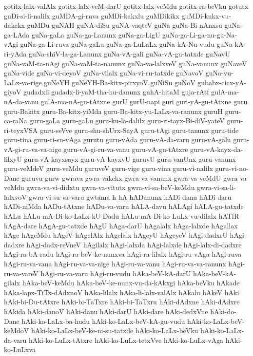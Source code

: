{gotitx-lalx-valAlx
gotitx-lalx-veM-darU
gotitx-lalx-veMdu
gotitx-ra-beVku
gotutx
guDi-si-li-nalilx
guMDA-gi-ruva
guMDi-kakxlu
guMDikikx
guMDi-kukx-vu-dakekx
guMDu
guNAH
guNA-diSu
guNA-vaqteV
guNa
guNa-Bi-nAnxsu
guNa-ga-LAda
guNa-gaLa
guNa-ga-Lanunx
guNa-ga-LigU
guNa-ga-Li-ga-nu-gu-Na-vAgi
guNa-ga-Li-ruva
guNa-gaLu
guNa-ga-LuLaLx
guNa-kA-Nu-vudu
guNa-kA-ri-yAda
guNa-shiV-la-ga-Lanunx
guNa-vA-gali
guNa-vA-gu-tatxde
guNavU
guNa-vaM-ta-nAgi
guNa-vaM-ta-nanunx
guNa-va-lalxveV
guNa-vanunx
guNaveV
guNa-vide
guNa-vi-deyoV
guNa-vilalx
guNa-vi-ru-tatxde
guNavoV
guNa-vu-LaLx-va-rige
guNeYH
guNeYH-Ba-kitx-pirxyoV
guNiSu
guNoV
gubabx-cicx-yA-giyoV
gudadxli
gudadx-li-yaM-tha-hu-danunx
guhA-hitaM
guja-rAtf
gulA-ma-nA-da-vanu
gulA-ma-nA-gu-tAtxne
gurU
gurU-napi
guri
guri-yA-gu-tAtxne
guru
guru-Bakitx
guru-Ba-kitx-yiMda
guru-Ba-kitx-yu-LaLx-va-ranunx
guruH
guru-ca-raNa
guru-gaLa
guru-gaLu
guru-ku-la-dalilx
guru-ri-tayx-Bi-diV-yateV
guru-ri-teyxVSA
guru-seVve
guru-shu-shUrx-SayA
guru-tAgi
guru-tanunx
guru-tide
guru-tina
guru-ti-su-vAga
gurutu
guru-vAda
guru-vA-da-varu
guru-vA-galu
guru-vA-gi-ru-va-va-nige
guru-vA-gi-ru-va-vanu
guru-vA-gu-tAtxre
guru-vA-kayx-da-lilxyU
guru-vA-kayxsayx
guru-vA-kayxvU
guruvU
guru-vanUnx
guru-vanunx
guru-veMdeV
guru-veMdu
guruveV
guru-vige
guru-vina
guru-vi-nalilx
guru-vi-no-Dane
guruvu
gurw
gwrava
gwra-vakekx
gwra-va-vanunx
gwra-va-veMdU
gwra-va-veMdu
gwra-va-vi-didxtu
gwra-va-vitutx
gwra-vi-sa-beV-keMdu
gwra-vi-sa-li-lalxvoV
gwra-vi-su-va-varu
gwtama
h
hA
hADanunx
hADi-danu
hADi-daru
hADi-niMda
hADu-tAtxne
hADu-va-varu
hALA-davu
hALAgi
hALA-gu-tatxde
hALu
hALu-mA-Di-ko-LaLx-kU-Dadu
hALu-mA-Di-ko-LuLx-vu-dilalx
hATfR
hAgA-dare
hAgA-gu-tatxde
hAgU
hAga-darU
hAgalalx
hAga-lalxde
hAgallax
hAge
hAgeMdu
hAgeV
hAgelAlx
hAgelalx
hAgeyU
hAgeyeV
hAgi-dadxrU
hAgi-dadxre
hAgi-dadx-reVneV
hAgilalx
hAgi-lalxda
hAgi-lalxde
hAgi-lalx-di-dadxre
hAgi-ra-bA-radu
hAgi-ra-beV-ke-nunxva
hAgi-ra-lilalx
hAgi-ru-vAga
hAgi-ruva
hAgi-ru-va-vana
hAgi-ru-va-va-nige
hAgi-ru-va-vanu
hAgi-ru-va-va-ranunx
hAgi-ru-va-vareV
hAgi-ru-va-varu
hAgi-ru-vudu
hAka-beV-kA-darU
hAka-beV-kA-gilalx
hAka-beV-keMdu
hAka-beV-ke-nunx-vu-da-kAkxgi
hAka-beVku
hAkade
hAka-lapx-TiTx-dAdxnoV
hAka-lilalx
hAka-li-lalx-valAlx
hAkalu
hAkeV
hAki
hAki-bi-Du-tAtxre
hAki-bi-TaTxre
hAki-bi-TaTxru
hAki-dAdxne
hAki-dAdxre
hAkida
hAki-danoV
hAki-danu
hAki-darU
hAki-dare
hAki-dedxVne
hAki-do-Dane
hAki-ko-LaLx-ba-hudu
hAki-ko-LaLx-beV-kA-gu-vudu
hAki-ko-LaLx-beV-keMdoV
hAki-ko-LaLx-beV-ke-ni-su-tatxde
hAki-ko-LaLx-beVku
hAki-ko-LaLx-da-varu
hAki-ko-LuLx-tAtxre
hAki-ko-LuLx-tetxVve
hAki-ko-LuLx-vAga
hAki-ko-LuLxva
}
